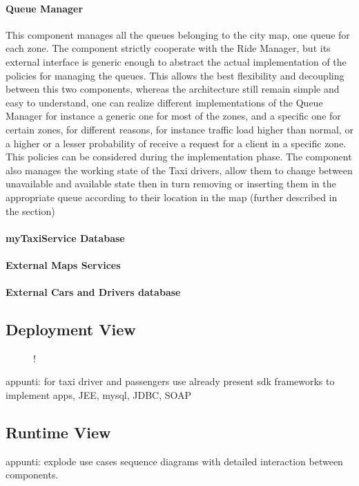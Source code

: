 \paragraph{Queue Manager}
This component manages all the queues belonging to the city map, one queue for each zone. The component strictly cooperate with the Ride Manager, but its external interface is generic enough to abstract the actual implementation of the policies for managing the queues. This allows the best flexibility and decoupling between this two components, whereas the architecture still remain simple and easy to understand, one can realize different implementations of the Queue Manager for instance a generic one for most of the zones, and a specific one for certain zones, for different reasons, for instance traffic load higher than normal, or a higher or a lesser probability of receive a request for a client in a specific zone. This policies can be considered during the implementation phase. \newline
The component also manages the working state of the Taxi drivers, allow them to change between unavailable and available state then in turn removing or inserting them in the appropriate queue according to their location in the map (further described in the  section)
\paragraph{myTaxiService Database}
\paragraph{External Maps Services}
\paragraph{External Cars and Drivers database}
\subsection{Deployment View}
\begin{figure}[H]
	\centering
	\resizebox{6in}
	{!}{}
\end{figure}
appunti: for taxi driver and passengers use already present sdk frameworks to implement apps, JEE, mysql, JDBC, SOAP
\subsection{Runtime View}
appunti: explode use cases sequence diagrams with detailed interaction between components.
